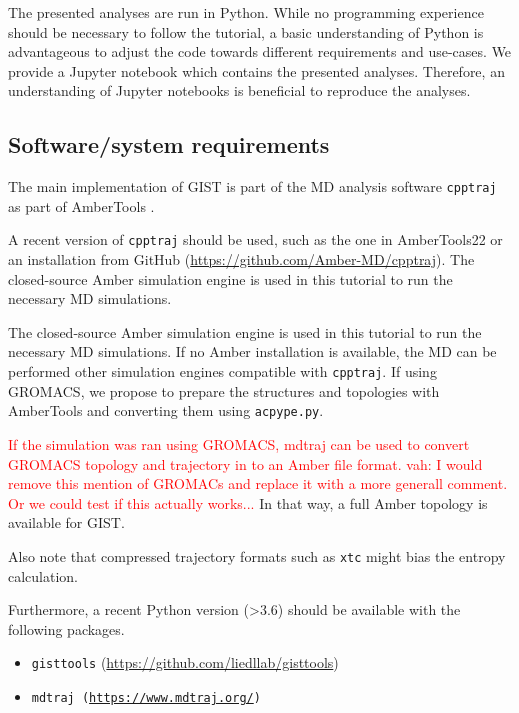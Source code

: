 \documentclass[9pt,tutorial]{livecoms}
\newcommand{\software}{\texttt}
\newcommand{\todo}{\textcolor{red}}
\newcommand\inlinecode{\texttt}
\begin{document}
The presented analyses are run in Python.
While no programming experience should be necessary to follow the tutorial, a basic understanding of Python is advantageous to adjust the code towards different requirements and use-cases. 
We provide a Jupyter notebook which contains the presented analyses. 
Therefore, an understanding of Jupyter notebooks is beneficial to reproduce the analyses.

\subsection{Software/system requirements}
The main implementation of GIST is part of the MD analysis software \software{cpptraj} as part of AmberTools \cite{amber22}.

A recent version of \software{cpptraj} should be used, such as the one in AmberTools22 or an installation from GitHub (\url{https://github.com/Amber-MD/cpptraj}).
The closed-source Amber simulation engine is used in this tutorial to run the necessary MD simulations. 


The closed-source Amber simulation engine is used in this tutorial to run the necessary MD simulations.
If no Amber installation is available, the MD can be performed other simulation engines compatible with \software{cpptraj}.
If using GROMACS, we propose to prepare the structures and topologies with AmberTools and converting them using \software{acpype.py}.

\todo {If the simulation was ran using GROMACS, mdtraj can be used to convert GROMACS topology and trajectory in to an Amber file format.}
\todo {vah: I would remove this mention of GROMACs and replace it with a more generall comment. Or we could test if this actually works...}
In that way, a full Amber topology is available for GIST.

Also note that compressed trajectory formats such as \inlinecode{xtc} might bias the entropy calculation.

Furthermore, a recent Python version (>3.6) should be available with the following packages.
\begin{itemize}
	\item \software{gisttools} (\url{https://github.com/liedllab/gisttools})
	\item \software{mdtraj (\url{https://www.mdtraj.org/})}
\end{itemize}
\end{document}
